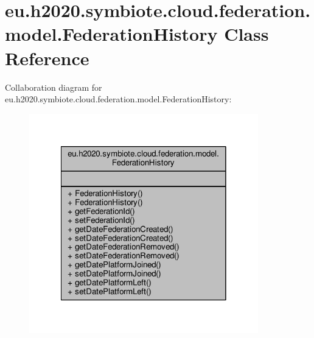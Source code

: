 \hypertarget{classeu_1_1h2020_1_1symbiote_1_1cloud_1_1federation_1_1model_1_1FederationHistory}{}\section{eu.\+h2020.\+symbiote.\+cloud.\+federation.\+model.\+Federation\+History Class Reference}
\label{classeu_1_1h2020_1_1symbiote_1_1cloud_1_1federation_1_1model_1_1FederationHistory}


Collaboration diagram for eu.\+h2020.\+symbiote.\+cloud.\+federation.\+model.\+Federation\+History\+:\nopagebreak
\begin{figure}[H]
\begin{center}
\leavevmode
\includegraphics[width=282pt]{classeu_1_1h2020_1_1symbiote_1_1cloud_1_1federation_1_1model_1_1FederationHistory__coll__graph}
\end{center}
\end{figure}
